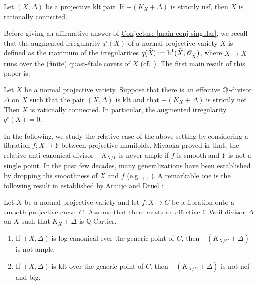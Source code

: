 \begin{conj}\label{main-conj-singular}
Let $(X,\Delta)$ be a projective klt pair.
If $-(K_X+\Delta)$ is strictly nef, 
then $X$ is  rationally connected.
\end{conj}


\noindent Before  giving  an affirmative answer of {\hyperref[main-conj-singular]{Conjecture \ref*{main-conj-singular}}}, we recall that the augmented irregularity $q^\circ(X)$ of a normal projective variety $X$ is defined as the maximum of the irregularities $q(\widetilde{X}):=\operatorname{h}^1(\widetilde{X},\mathscr O_{\widetilde{X}})$, where $\widetilde{X}\to X$ runs over the (finite) quasi-\'etale covers of $X$ (cf.~\cite[Definition 2.6]{NZ10}). The first main result of this paper is:

\begin{mainthm}
\label{mainthm-RC}
Let $X$ be a normal projective variety. Suppose that there is an effective $\mathbb Q$-divisor $\Delta$ on $X$ such that the pair $(X,\Delta)$ is klt and that $-(K_X+\Delta)$ is strictly nef. Then $X$ is rationally connected.
In particular, the augmented irregularity $q^\circ(X)=0$.
\end{mainthm}






In the following, we  study the relative case of the above setting by considering a fibration $f:X\rightarrow Y$  between projective manifolds.  
 Miyaoka proved in \cite[Theorem 2]{Miy93} that, the relative anti-canonical divisor $-K_{X/Y}$ is never ample if $f$ is  smooth and $Y$ is not a single point. 
In the past few decades, many generalizations have been established  by dropping the smoothness of $X$ and $f$ (e.g.  \cite{Zhang96}, \cite{ADK08}, \cite{AD13}). A remarkable one 
 is the following result in \cite[Theorem 5.1]{AD13} established by  Araujo and Druel :

\begin{thm}\label{t.AD}
Let $X$ be a normal projective variety and let $f:X\rightarrow C$ be a fibration onto a smooth projective curve $C$.
Assume that there exists an effective $\mathbb{Q}$-Weil divisor $\Delta$ on $X$ such that $K_{X}+\Delta$ is $\mathbb{Q}$-Cartier.
	\begin{enumerate}
		\item[\rm(1)] If $(X,\Delta)$ is log canonical over the generic point of $C$, then $-(K_{X/C}+\Delta)$ is not ample.
		
		\item[\rm(2)] If $(X,\Delta)$ is klt over the generic point of $C$, then $-(K_{X/C}+\Delta)$ is not nef and big.
	\end{enumerate}
\end{thm}


